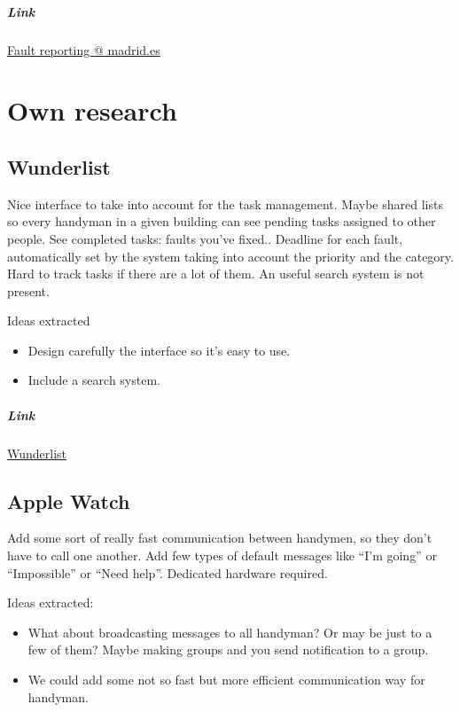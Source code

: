 \subparagraph{Link} \href{https://sede.madrid.es/portal/site/tramites/menuitem.77902acb5cdfe761e8e4e8e4ecd08a0c/?vgnextoid=ce5ea38813180210VgnVCM100000c90da8c0RCRD}{Fault reporting @ madrid.es}

\section{Own research}

\subsection{Wunderlist}

\begin{itemize}
\adv Nice interface to take into account for the task management.
\adv Maybe shared lists so every handyman in a given building can see pending tasks assigned to other people.
\adv See completed tasks: faults you've fixed..
\adv Deadline for each fault, automatically set by the system taking into account the priority and the category.
\dsv Hard to track tasks if there are a lot of them.
\dsv An useful search system is not present.
\end{itemize}

Ideas extracted

\begin{itemize}
\item Design carefully the interface so it's easy to use.
\item Include a search system.
\end{itemize}

\subparagraph{Link} \href{http://wunderlist.com}{Wunderlist}

\subsection{Apple Watch}

\begin{itemize}
\adv Add some sort of really fast communication between handymen, so they don't have to call one another.
\adv Add few types of default messages like “I'm going” or “Impossible” or “Need help”.
\dsv Dedicated hardware required.
\end{itemize}

Ideas extracted:

\begin{itemize}\label{AppleWatch}
\item What about broadcasting messages to all handyman? Or may be just to a few of them? Maybe making groups and you send notification to a group.
\item We could add some not so fast but more efficient communication way for handyman.
\end{itemize}

